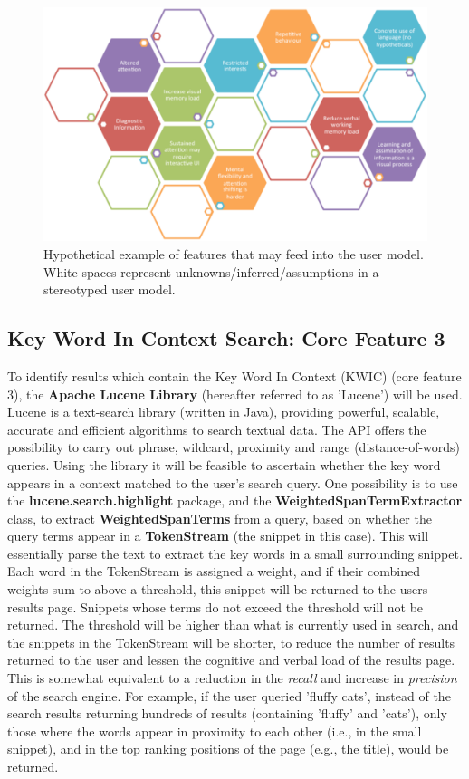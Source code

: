 \documentclass[a4paper, 10pt]{article}
\begin{document}
\begin{figure}[H]
\begin{center}
    \includegraphics[scale=0.5]{usermodelconstruct}
    \caption{Hypothetical example of features that may feed into the user model. White spaces represent unknowns/inferred/assumptions in a stereotyped user model.}
    \label{usermodelconstruct}
\end{center}
\end{figure}


\subsection{Key Word In Context Search: Core Feature 3}\label{apache}
To identify results which contain the Key Word In Context (KWIC)\cite{kwic} (core feature 3), the \textbf{Apache Lucene Library} (hereafter referred to as 'Lucene') will be used. Lucene is a text-search library (written in Java), providing powerful, scalable, accurate and efficient algorithms to search textual data. The API offers the possibility to carry out phrase, wildcard, proximity and range (distance-of-words) queries. Using the library it will be feasible to ascertain whether the key word appears in a context matched to the user's search query. One possibility is to use the \textbf{lucene.search.highlight} package, and the \textbf{WeightedSpanTermExtractor} class, to extract \textbf{WeightedSpanTerms} from a query, based on whether the query terms appear in a \textbf{TokenStream} (the snippet in this case). This will essentially parse the text to extract the key words in a small surrounding snippet. Each word in the TokenStream is assigned a weight, and if their combined weights sum to above a threshold, this snippet will be returned to the users results page. Snippets whose terms do not exceed the threshold will not be returned. The threshold will be higher than what is currently used in search, and the snippets in the TokenStream will be shorter, to reduce the number of results returned to the user and lessen the cognitive and verbal load of the results page. This is somewhat equivalent to a reduction in the \textit{recall} and increase in \textit{precision} of the search engine. For example, if the user queried 'fluffy cats', instead of the search results returning hundreds of results (containing 'fluffy' and 'cats'), only those where the words appear in proximity to each other (i.e., in the small snippet), and in the top ranking positions of the page (e.g., the title), would be returned. 
\end{document}
